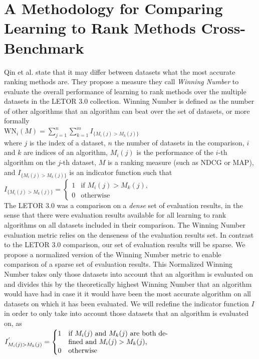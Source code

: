 \documentclass{sig-alternate}
\begin{document}
\section{A Methodology for Comparing Learning to Rank Methods Cross-Benchmark}
Qin et al. \cite{Qin2010} state that it may differ between datasets what the most accurate ranking methods are. They propose a measure they call \emph{Winning Number} to evaluate the overall performance of learning to rank methods over the multiple datasets in the LETOR 3.0 collection. Winning Number is defined as the number of other algorithms that an algorithm can beat over the set of datasets, or more formally\\
$\text{WN}_i(M) = \sum\nolimits_{j=1}^n \sum\nolimits_{k=1}^m I_{\{M_i(j)>M_k(j)\}}$\\
where $j$ is the index of a dataset, $n$ the number of datasets in the comparison, $i$ and $k$ are indices of an algorithm, $M_i(j)$ is the performance of the $i$-th algorithm on the $j$-th dataset, $M$ is a ranking measure (such as NDCG or MAP), and $I_{\{M_i(j)>M_k(j)\}}$ is an indicator function such that\\
$I_{\{M_i(j)>M_k(j)\}} = \begin{cases}
1 & \text{if } M_i(j) > M_k(j), \\
0 & \text{otherwise}
\end{cases}$\\
The LETOR 3.0 was a comparison on a \emph{dense} set of evaluation results, in the sense that there were evaluation results available for all learning to rank algorithms on all datasets included in their comparison. The Winning Number evaluation metric relies on the denseness of the evaluation results set. In contrast to the LETOR 3.0 comparison, our set of evaluation results will be sparse. We propose a normalized version of the Winning Number metric to enable comparison of a sparse set of evaluation results. This Normalized Winning Number takes only those datasets into account that an algorithm is evaluated on and divides this by the theoretically highest Winning Number that an algorithm would have had in case it it would have been the most accurate algorithm on all datasets on which it has been evaluated. We will redefine the indicator function $I$ in order to only take into account those datasets that an algorithm is evaluated on, as\\
$I^{'}_{M_i(j)>M_k(j)} = \begin{cases}
1 & \parbox[t]{5cm}{if $M_i(j)$ and $M_k(j)$ are both defined and $M_i(j) > M_k(j)$,}\\
0 & \parbox[t]{5cm}{otherwise}
\end{cases}$\\
\end{document}
